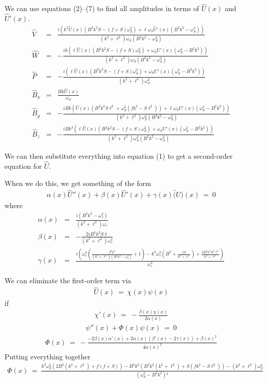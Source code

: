 \documentclass[aps,prl,preprint
,superscriptaddress]{revtex4-1}\newcommand{\SSC}{S/S_{c}}
\newcommand\Beq{\begin{eqnarray}}
\newcommand\Eeq{\end{eqnarray}}
\begin{document}
We can use equations (2)--(7) to find all amplitudes in terms of $\hat{U}(x)$ and $\hat{U}'(x)$. 
\Beq
\hat{V} &=& \frac{i \left(k^2 \hat{U}(x) \left(B^2 k^2 S-(f+S) \omega
   _S^2\right)+\ell  \omega _S \hat{U}'(x) \left(B^2 k^2-\omega
   _S^2\right)\right)}{\left(k^2+\ell ^2\right) \omega _S
   \left(B^2 k^2-\omega _S^2\right)}\\
\hat{W} &=& -\frac{i k \left(\ell  \hat{U}(x) \left(B^2 k^2 S-(f+S) \omega
   _S^2\right)+\omega _S U'(x) \left(\omega _S^2-B^2
   k^2\right)\right)}{\left(k^2+\ell ^2\right) \omega _S
   \left(B^2 k^2-\omega _S^2\right)}\\
   \hat{P} &=& -\frac{i \left(\ell  \hat{U}(x) \left(B^2 k^2 S-(f+S) \omega
   _S^2\right)+\omega _S U'(x) \left(\omega _S^2-B^2
   k^2\right)\right)}{\left(k^2+\ell ^2\right) \omega _S^2}\\
   \hat{B}_{x} &=& \frac{B k \hat{U}(x)}{\omega _S}\\
   \hat{B}_{y} &=& -\frac{i B k \left(\hat{U}(x) \left(B^2 k^2 S \ell ^2+\omega _S^2
   \left(f k^2-S \ell ^2\right)\right)+\ell  \omega _S
   U'(x) \left(\omega _S^2-B^2
   k^2\right)\right)}{\left(k^2+\ell ^2\right) \omega _S^2
   \left(B^2 k^2-\omega _S^2\right)}\\
   \hat{B}_{z} &=& -\frac{i B k^2 \left(\ell  \hat{U}(x) \left(B^2 k^2 S-(f+S)
   \omega _S^2\right)+\omega _S U'(x) \left(\omega _S^2-B^2
   k^2\right)\right)}{\left(k^2+\ell ^2\right) \omega _S^2
   \left(B^2 k^2-\omega _S^2\right)}
\Eeq

We can then substitute everything into equation (1) to get a second-order equation for $\hat{U}$. 

When we do this, we get something of the form 
\Beq
\alpha(x) \hat{U}''(x) + \beta(x) \hat{U}'(x) + \gamma(x) \hat(U)(x) \ = \ 0
\Eeq
where
\Beq
\alpha(x) &=& \frac{i \left(B^2 k^2-\omega _s^2\right)}{\left(k^2+\ell
   ^2\right) \omega _s} \\ 
   \beta(x) &=& -\frac{2 i B^2 k^2 S \ell }{\left(k^2+\ell ^2\right) \omega
   _s^2} \\
   \gamma(x) &=& \frac{i \left(\omega _s^4 \left(\frac{f^2
   k^2}{\left(k^2+\ell ^2\right) \left(B^2 k^2-\omega
   _s^2\right)}+1\right)-k^2 \omega _s^2 \left(B^2+\frac{f
   S}{k^2+\ell ^2}\right)+\frac{2 B^2 k^2 S^2 \ell
   ^2}{k^2+\ell ^2}\right)}{\omega _s^3}
\Eeq

We can eliminate the first-order term via
\Beq
\hat{U}(x) \ = \ \chi(x) \psi(x) 
\Eeq
if 
\Beq
\chi'(x) \  = \ -\frac{\beta (x) \chi (x)}{2 \alpha (x)}
\Eeq
\Beq
\psi''(x) + \Phi(x) \psi(x) \ = \ 0
\Eeq
\Beq
\Phi(x)  \ = \ -\frac{-2 \beta (x) \alpha '(x)+2 \alpha (x) \left(\beta'(x)-2 \gamma (x)\right)+\beta (x)^2}{4 \alpha (x)^2}
\Eeq
Putting everything together 
\Beq
\Phi(x) \ = \ \tfrac{k^2 \omega _S^2 \left(2 B^2 \left(k^2+\ell
   ^2\right)+f (f+S)\right)-B^2 k^2 \left(B^2 k^2
   \left(k^2+\ell ^2\right)+S \left(f k^2-S \ell
   ^2\right)\right)-\left(k^2+\ell ^2\right) \omega
   _S^4}{\left(\omega _S^2-B^2 k^2\right){}^2}
\Eeq
\end{document}
